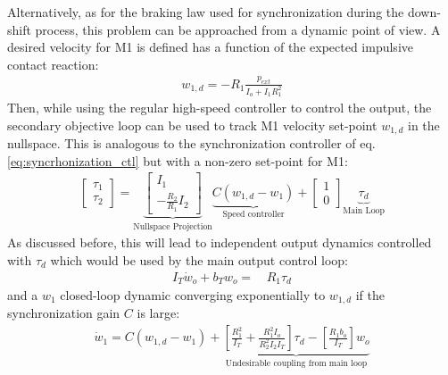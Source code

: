 %
Alternatively, as for the braking law used for synchronization during the down-shift process, this problem can be approached from a dynamic point of view. A desired velocity for M1 is defined has a function of the expected impulsive contact reaction:
%
\begin{align}
w_{1,d}  = - R_1 \frac{ p_{ext} }{I_o + I_1 R_1^2}
\label{eq:dsdm_impact_gen_delta_w1}
\end{align}
%
Then, while using the regular high-speed controller to control the output, the secondary objective loop can be used to track M1 velocity set-point $w_{1,d}$ in the nullspace. This is analogous to the synchronization controller of eq. \eqref{eq:syncrhonization_ctl} but with a non-zero set-point for M1:
%
\begin{align}
\left[ \begin{array}{c}
\tau_1 \\
\tau_2
\end{array} \right]
 = 
\underbrace{\left[ \begin{array}{c}
I_1 \\
-\frac{R_2 }{R_1} I_2 
\end{array} \right]}_{\text{Nullspace Projection}} \underbrace{C (w_{1,d} -  w_1)}_{\text{Speed controller}} + 
\left[ \begin{array}{c}
1 \\
0 
\end{array} \right]  \underbrace{ \tau_d }_{\text{Main Loop}}
\end{align}
%
As discussed before, this will lead to independent output dynamics controlled with $\tau_d$ which would be used by the main output control loop:
\begin{align}
I_T \dot{w}_o +
b_T  w_o
=& \, R_1 \tau_d  
\end{align}
and a $w_1$ closed-loop dynamic converging exponentially to $w_{1,d}$ if the synchronization gain $C$ is large:
\begin{align}
 \dot{w}_1 = C \left( w_{1,d} - w_1 \right) + \underbrace{\left[\frac{R_1^2}{I_T} + \frac{R_1^2 I_o}{R_2^2 I_2 I_T} \right] \tau_d - \left[\frac{R_1 b_o}{I_T}\right] w_o }_{\text{Undesirable coupling from main loop}}
\end{align}


